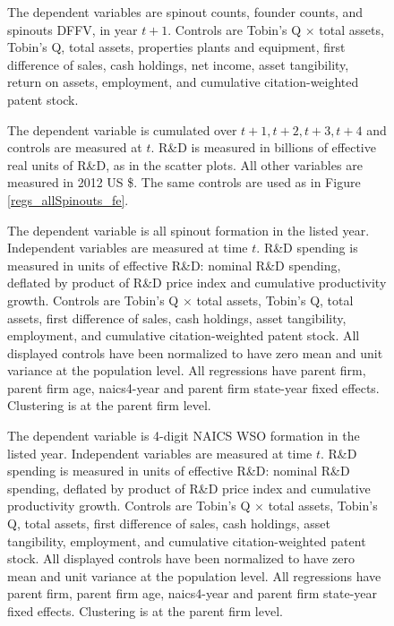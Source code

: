 \documentclass[11pt,english]{article}
\theoremstyle{remark}
\begin{document}
\begin{figure}[p]
	\centering
	
	\caption{The dependent variables are spinout counts, founder counts, and spinouts DFFV, in year $t+1$. Controls are Tobin's Q $\times$ total assets, Tobin's Q, total assets, properties plants and equipment, first difference of sales, cash holdings, net income, asset tangibility, return on assets, employment, and cumulative citation-weighted patent stock.}
	\label{regs_allspinouts_fe_accounting}
\end{figure}

\begin{figure}[p]
	\centering
	
	\caption{The dependent variable is cumulated over $t+1,t+2,t+3,t+4$ and controls are measured at $t$. R\&D is measured in billions of effective real units of R\&D, as in the scatter plots. All other variables are measured in 2012 US \$. The same controls are used as in Figure \ref{regs_allSpinouts_fe}.}
	\label{regs_spinouts_wso_fe_accounting}
\end{figure}

\begin{figure}[p]
	\centering
	\small
	
	\caption{\small The dependent variable is all spinout formation in the listed year. Independent variables are measured at time $t$. R\&D spending is measured in units of effective R\&D: nominal R\&D spending, deflated by product of R\&D price index and cumulative productivity growth. Controls are Tobin's Q $\times$ total assets, Tobin's Q, total assets, first difference of sales, cash holdings, asset tangibility, employment, and cumulative citation-weighted patent stock. All displayed controls have been normalized to have zero mean and unit variance at the population level. All regressions have parent firm, parent firm age, naics4-year and parent firm state-year fixed effects. Clustering is at the parent firm level.}
	\label{regs_spinouts_accounting}
\end{figure}

\begin{figure}[p]
	\centering
	\small
	
	\caption{\small The dependent variable is 4-digit NAICS WSO formation in the listed year. Independent variables are measured at time $t$. R\&D spending is measured in units of effective R\&D: nominal R\&D spending, deflated by product of R\&D price index and cumulative productivity growth. Controls are Tobin's Q $\times$ total assets, Tobin's Q, total assets, first difference of sales, cash holdings, asset tangibility, employment, and cumulative citation-weighted patent stock. All displayed controls have been normalized to have zero mean and unit variance at the population level. All regressions have parent firm, parent firm age, naics4-year and parent firm state-year fixed effects. Clustering is at the parent firm level.}
	\label{regs_spinouts_wso4_accounting}
\end{figure}
\end{document}
